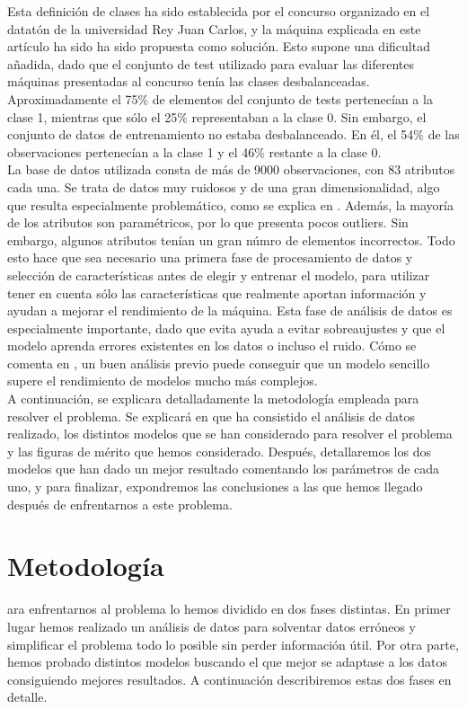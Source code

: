 \documentclass[journal,twoside]{JoPhA}
\begin{document}
Esta definición de clases ha sido establecida por el concurso organizado en el datatón de la universidad Rey Juan Carlos, y la máquina explicada en este artículo ha sido ha sido propuesta como solución. Esto supone una dificultad añadida, dado que el conjunto de test utilizado para evaluar las diferentes máquinas presentadas al concurso tenía las clases desbalanceadas. Aproximadamente el 75\% de elementos del conjunto de tests pertenecían a la clase 1, mientras que sólo el 25\% representaban a la clase 0. Sin embargo, el conjunto de datos de entrenamiento no estaba desbalanceado. En él, el 54\% de las observaciones pertenecían a la clase 1 y el 46\% restante a la clase 0. \\

La base de datos utilizada consta de más de 9000 observaciones, con 83 atributos cada una. Se trata de datos muy ruidosos y de una gran dimensionalidad, algo que resulta especialmente problemático, como se explica en \cite{alta_dimensionalidad}. Además, la mayoría de los atributos son paramétricos, por lo que presenta pocos outliers. Sin embargo, algunos atributos tenían un gran númro de elementos incorrectos. Todo esto hace que sea necesario una primera fase de procesamiento de datos y selección de características antes de elegir y entrenar el modelo, para utilizar tener en cuenta sólo las características que realmente aportan información y ayudan a mejorar el rendimiento de la máquina. Esta fase de análisis de datos es especialmente importante, dado que evita ayuda a evitar sobreaujustes y que el modelo aprenda errores existentes en los datos o incluso el ruido. Cómo se comenta en \cite{extraccion_datos}, un buen análisis previo puede conseguir que un modelo sencillo supere el rendimiento de modelos mucho más complejos. \\

A continuación, se explicara detalladamente la metodología empleada para resolver el problema. Se explicará en que ha consistido el análisis de datos realizado, los distintos modelos que se han considerado para resolver el problema y las figuras de mérito que hemos considerado. Después, detallaremos los dos modelos que han dado un mejor resultado comentando los parámetros de cada uno, y para finalizar, expondremos las conclusiones a las que hemos llegado después de enfrentarnos a este problema. \\


\section{Metodología}
ara enfrentarnos al problema lo hemos dividido en dos fases distintas. En primer lugar hemos realizado un análisis de datos para solventar datos erróneos y simplificar el problema todo lo posible sin perder información útil. Por otra parte, hemos probado distintos modelos buscando el que mejor se adaptase a los datos consiguiendo mejores resultados. A continuación describiremos estas dos fases en detalle.
\end{document}
